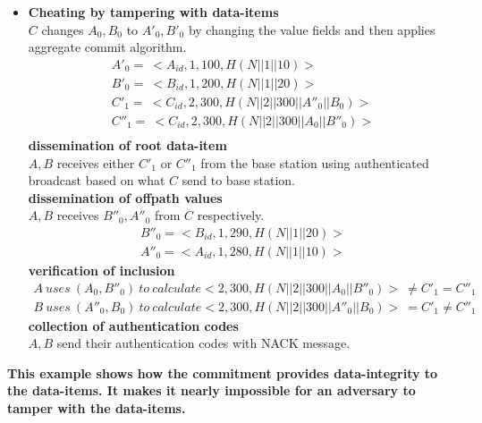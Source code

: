\begin{exmp}
\begin{itemize}
	\item \textbf{Cheating by tampering with data-items}\\
		$C$ changes $A_{0},B_{0}$ to $A'_{0},B'_{0}$ by changing the value fields and then applies aggregate commit algorithm.\\
		\begin{equation}
			\begin{array}{l}
				A'_{0} =\ <A_{id},1,100, H(N||1||10)>\\
				B'_{0} =\ <B_{id},1,200, H(N||1||20)>\\
				C'_{1} =\ <C_{id},2,300, H(N||2||300||A''_{0}||B_{0})>\\
				C''_{1} =\ <C_{id},2,300, H(N||2||300||A_{0}||B''_{0})>\\
			\end{array}
		\end{equation}
		\textbf{dissemination of root data-item}\\
		$A,B$ receives either $C'_{1}$ or $C''_{1}$ from the base station using authenticated broadcast based on what $C$ send to base station.\\
		\textbf{dissemination of offpath values}\\
		$A,B$ receives $B''_{0},A''_{0}$ from $C$ respectively.
		\begin{equation}
			\begin{array}{l}
				B''_{0} = <B_{id},1,290,H(N||1||20)>\\
				A''_{0} = <A_{id},1,280,H(N||1||10)>
			\end{array}
		\end{equation}
		\textbf{verification of inclusion}
		\begin{equation}
			\begin{array}{l}
				A\ uses\ (A_{0}, B''_{0})\ to\ calculate <2,300,H(N||2||300||A_{0}||B''_{0})>\  \neq C'_{1} = C''_{1}\\
				B\ uses\ (A''_{0}, B_{0})\ to\ calculate <2,300,H(N||2||300||A''_{0}||B_{0})>\  = C'_{1} \neq C''_{1}
			\end{array}
		\end{equation}
		\textbf{collection of authentication codes}\\
			$A,B$ send their authentication codes with NACK message.\\
	\end{itemize}
	\textbf{	This example shows how the commitment provides data-integrity to the data-items.
						It makes it nearly impossible for an adversary to tamper with the data-items.}
	\end{exmp}


